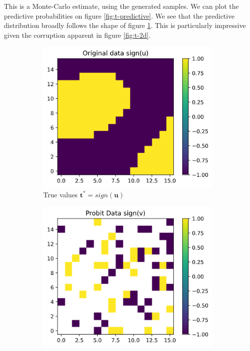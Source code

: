 \documentclass[]{article}
\newcommand{\tbold}{\boldsymbol{t}}
\newcommand{\ubold}{\boldsymbol{u}}
\begin{document}
This is a Monte-Carlo estimate, using the generated samples. We can plot the predictive probabilities on figure \ref{fig:t-predictive}. We see that the predictive distribution broadly follows the shape of figure \ref{fig:sign-u}. This is particularly impressive given the corruption apparent in figure \ref{fig:t-2d}.
%
\begin{figure}[!h]
	\centering
	\begin{subfigure}{0.32\linewidth}
		\includegraphics[width=\linewidth]{sign-u.png}
		\caption{True values $\tbold^* = sign(\ubold)$}
		\label{fig:sign-u}
	\end{subfigure}
	\begin{subfigure}{0.32\linewidth}
		\includegraphics[width=\linewidth]{t-2d.png}

\end{subfigure}
\end{figure}
\end{document}
